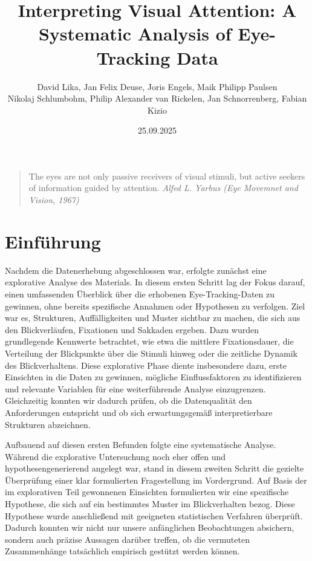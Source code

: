 \documentclass[
    language=german, %
    thesis=seminar, %
    supervisor=postdoc, %
    multiauthor=true, %
    ]{settings/csssa-thesis}
\title{Interpreting Visual Attention: A Systematic Analysis of Eye-Tracking Data}
\author{David Lika, Jan Felix Deuse, Joris Engels, Maik Philipp Paulsen \\
 Nikolaj Schlumbohm, Philip Alexander van Rickelen, Jan Schnorrenberg, Fabian Kizio}
\date{25.09.2025}
\begin{document}
\maketitlepage
\maketitle

\begin{quote}
    The eyes are not only passive receivers of visual stimuli, but active seekers of information guided by attention.
    {\textit{Alfed L. Yarbus (Eye Movemnet and Vision, 1967)}}
\end{quote}

\begin{abstract}
    \lipsum[1]
\end{abstract}

\section{Einführung}

Nachdem die Datenerhebung abgeschlossen war, erfolgte zunächst eine explorative Analyse des Materials.
In diesem ersten Schritt lag der Fokus darauf, einen umfassenden Überblick über die erhobenen Eye-Tracking-Daten zu gewinnen,
ohne bereits spezifische Annahmen oder Hypothesen zu verfolgen. 
Ziel war es, Strukturen, Auffälligkeiten und Muster sichtbar zu machen, die sich aus den Blickverläufen,
Fixationen und Sakkaden ergeben. Dazu wurden grundlegende Kennwerte betrachtet, wie etwa die mittlere Fixationsdauer,
die Verteilung der Blickpunkte über die Stimuli hinweg oder die zeitliche Dynamik des Blickverhaltens.
Diese explorative Phase diente insbesondere dazu, erste Einsichten in die Daten zu gewinnen,
mögliche Einflussfaktoren zu identifizieren und relevante Variablen für eine weiterführende Analyse einzugrenzen.
Gleichzeitig konnten wir dadurch prüfen, ob die Datenqualität den Anforderungen entspricht und ob sich erwartungsgemä{\ss}
interpretierbare Strukturen abzeichnen. 

Aufbauend auf diesen ersten Befunden folgte eine systematische Analyse.
Während die explorative Untersuchung noch eher offen und hypothesengenerierend angelegt war,
stand in diesem zweiten Schritt die gezielte Überprüfung einer klar formulierten Fragestellung im Vordergrund.
Auf Basis der im explorativen Teil gewonnenen Einsichten formulierten wir eine spezifische Hypothese,
die sich auf ein bestimmtes Muster im Blickverhalten bezog. Diese Hypothese wurde anschlie{\ss}end mit geeigneten
statistischen Verfahren überprüft. Dadurch konnten wir nicht nur unsere anfänglichen Beobachtungen absichern,
sondern auch präzise Aussagen darüber treffen, ob die vermuteten Zusammenhänge tatsächlich empirisch gestützt werden können. 
\end{document}
